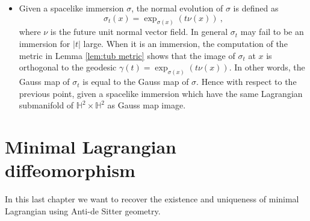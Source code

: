 \documentclass[10pt,a4paper,oneside,reqno]{book}
\def\H{\mathbb{H}}
\theoremstyle{plain}
\theoremstyle{definition}
\theoremstyle{plain}
\theoremstyle{plain}
\theoremstyle{mystyleNormalFont}
\begin{document}
\begin{itemize}[leftmargin=0.5cm]
\item Given a spacelike immersion $\sigma$,  the normal evolution of $\sigma$ is defined as 
\[
    \sigma_t(x)=\exp_{\sigma(x)}(t\nu(x))~,
\]
where $\nu$ is the future unit normal vector field. In general $\sigma_t$ may fail to be an immersion for $|t|$ large. When it is an immersion, the computation of the metric in Lemma \ref{lem:tub metric} shows that the image of $\sigma_t$ at $x$ is orthogonal to the geodesic $\gamma(t)=\exp_{\sigma(x)}(t\nu(x))$. In other words, the Gauss map of $\sigma_t$ is equal to the Gauss map of $\sigma$. Hence with respect to the previous point, given a spacelike immersion which have the same  Lagrangian submanifold of $\H^2\times\H^2$ as Gauss map image.
\end{itemize}

\chapter{Minimal Lagrangian diffeomorphism}
In this last chapter we want to recover the existence and uniqueness of minimal Lagrangian using Anti-de Sitter geometry.
\end{document}
